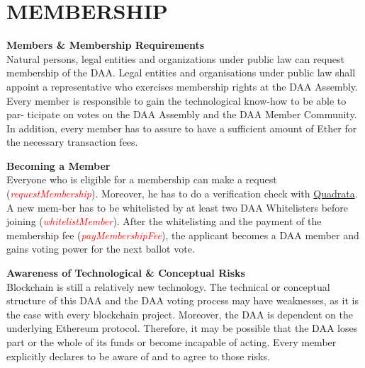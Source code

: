 \section{MEMBERSHIP}

\item \textbf{Members \& Membership Requirements} \\
Natural persons, legal entities and organizations under public law can request membership of the DAA.
Legal entities and organisations under public law shall appoint a representative who exercises membership rights at the DAA Assembly. %
Every member is responsible to gain the technological know-how to be able to par- ticipate on votes on the DAA Assembly and the DAA Member Community.
In addition, every member has to assure to have a sufficient amount of Ether for the necessary transaction fees.

\item \textbf{Becoming a Member} \\
Everyone who is eligible for a membership can make a request (\textcolor{red}{\emph{requestMembership}}).
Moreover, he has to do a verification check with \href{https://quadrata.com/}{Quadrata}. %
A new mem-ber has to be whitelisted by at least two DAA Whitelisters before joining (\textcolor{red}{\emph{whitelistMember}}).
After the whitelisting and the payment of the membership fee (\textcolor{red}{\emph{payMembershipFee}}), the applicant becomes a DAA member and gains voting power for the next ballot vote.

\item \textbf{Awareness of Technological \& Conceptual Risks} \\
Blockchain is still a relatively new technology.
The technical or conceptual structure of this DAA and the DAA voting process may have weaknesses, as it is the case with every blockchain project.
Moreover, the DAA is dependent on the underlying Ethereum protocol.
Therefore, it may be possible that the DAA loses part or the whole of its funds or become incapable of acting.
Every member explicitly declares to be aware of and to agree to those risks.
